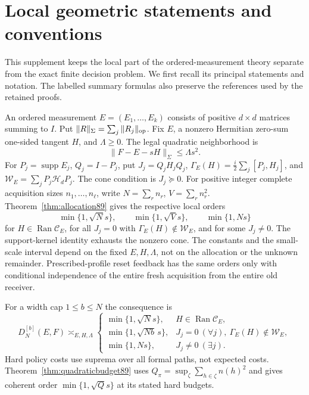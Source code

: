 \section{Local geometric statements and conventions}
\label{sec:introduction84}
This supplement keeps the local part of the ordered-measurement theory
separate from the exact finite decision problem.  We first recall its
principal statements and notation.  The labelled summary formulas also
preserve the references used by the retained proofs.

An ordered measurement $E=(E_1,\ldots,E_k)$ consists of positive
$d\times d$ matrices summing to $I$.  Put
$\|R\|_\Sigma=\sum_j\|R_j\|_{\rm op}$.  Fix $E$, a nonzero
Hermitian zero-sum one-sided tangent $H$, and $\Lambda\ge0$.  The
legal quadratic neighborhood is
\begin{equation}\label{eq:fronttube87}
                 \|F-E-sH\|_\Sigma\le\Lambda s^2.
\end{equation}
For $P_j=\operatorname{supp}E_j$, $Q_j=I-P_j$, put
$J_j=Q_jH_jQ_j$, $\Gamma_E(H)=\frac i2\sum_j[P_j,H_j]$, and
$\mathcal W_E=\sum_jP_j\mathcal H_dP_j$.  The cone condition is
$J_j\succeq0$.  For positive integer complete acquisition sizes
$n_1,\ldots,n_\ell$, write $N=\sum_rn_r$, $V=\sum_rn_r^2$.
Theorem~\ref{thm:allocation89} gives the respective local orders
\begin{equation}\label{eq:frontprofile89}
 \min\{1,\sqrt N s\},\qquad\min\{1,\sqrt V s\},\qquad\min\{1,Ns\}
\end{equation}
for $H\in\operatorname{Ran}\mathcal C_E$, for all $J_j=0$ with
$\Gamma_E(H)\notin\mathcal W_E$, and for some $J_j\ne0$.
The support-kernel identity exhausts the nonzero cone.  The constants
and the small-scale interval depend on the fixed $E,H,\Lambda$,
not on the allocation or the unknown remainder.  Prescribed-profile
reset feedback has the same orders only with conditional independence
of the entire fresh acquisition from the entire old receiver.

For a width cap $1\le b\le N$ the consequence is
\begin{equation}\label{eq:frontwidth87}
 D_N^{[b]}(E,F)\asymp_{E,H,\Lambda}
 \begin{cases}
 \min\{1,\sqrt Ns\},&H\in\operatorname{Ran}\mathcal C_E,\\
 \min\{1,\sqrt{Nb}\,s\},&J_j=0\ (\forall j),\ \Gamma_E(H)\notin\mathcal W_E,\\
 \min\{1,Ns\},&J_j\ne0\ (\exists j).
 \end{cases}
\end{equation}
Hard policy costs use suprema over all formal paths, not expected
costs.  Theorem~\ref{thm:quadraticbudget89} uses
$Q_\pi=\sup_\zeta\sum_{h\in\zeta}n(h)^2$ and gives coherent
order $\min\{1,\sqrt Qs\}$ at its stated hard budgets.

